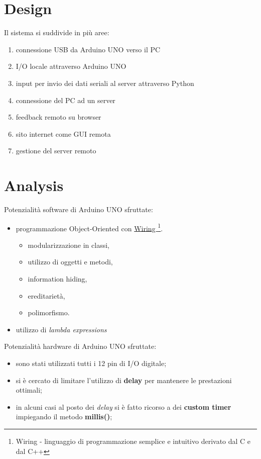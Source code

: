 \section{Design}
Il sistema si suddivide in più aree:
\begin{enumerate}
	\item connessione USB da Arduino UNO verso il PC
	\item I/O locale attraverso Arduino UNO
	\item input per invio dei dati seriali al server attraverso Python
	\item connessione del PC ad un server
	\item feedback remoto su browser
	\item sito internet come GUI remota
	\item gestione del server remoto
\end{enumerate}

\section{Analysis}
Potenzialità software di Arduino UNO sfruttate:
\begin{itemize}
	\item programmazione Object-Oriented con \href{https://it.wikipedia.org/wiki/Wiring}{Wiring \footnote{Wiring - linguaggio di programmazione semplice e intuitivo derivato dal C e dal C++}}.
	\begin{itemize}
		\item modularizzazione in classi,
		\item utilizzo di oggetti e metodi,
		\item information hiding, 
		\item ereditarietà, 
		\item polimorfismo.
	\end{itemize}
	\item utilizzo di \textit{lambda expressions}
\end{itemize}
Potenzialità hardware di Arduino UNO sfruttate:
\begin{itemize}
	\item sono stati utilizzati tutti i 12 pin di I/O digitale;
	\item si è cercato di limitare l'utilizzo di \textbf{delay} per mantenere le prestazioni ottimali;
	\item in alcuni casi al posto dei \textit{delay} si è fatto ricorso a dei \textbf{custom timer} impiegando il metodo \textbf{millis()};
\end{itemize}